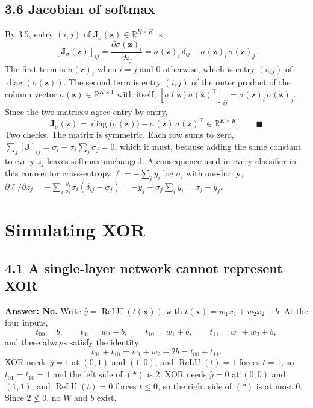 \documentclass[11pt]{article}
\newcommand{\R}{\mathbb{R}}
\DeclareMathOperator{\diag}{diag}
\DeclareMathOperator{\ReLU}{ReLU}
\begin{document}
\subsection*{3.6 Jacobian of softmax}
By 3.5, entry $(i,j)$ of $\mathbf{J}_\sigma(\mathbf{z})\in\R^{K\times K}$ is
\[
[\mathbf{J}_\sigma(\mathbf{z})]_{ij} = \frac{\partial\sigma(\mathbf{z})_i}{\partial z_j} = \sigma(\mathbf{z})_i\,\delta_{ij} - \sigma(\mathbf{z})_i\,\sigma(\mathbf{z})_j .
\]
The first term is $\sigma(\mathbf{z})_i$ when $i=j$ and $0$ otherwise, which is entry $(i,j)$ of $\diag(\sigma(\mathbf{z}))$. The second term is entry $(i,j)$ of the outer product of the column vector $\sigma(\mathbf{z})\in\R^{K\times1}$ with itself, $[\sigma(\mathbf{z})\sigma(\mathbf{z})^\top]_{ij} = \sigma(\mathbf{z})_i\,\sigma(\mathbf{z})_j$. Since the two matrices agree entry by entry,
\[
\mathbf{J}_\sigma(\mathbf{z}) = \diag\big(\sigma(\mathbf{z})\big) - \sigma(\mathbf{z})\,\sigma(\mathbf{z})^\top\in\R^{K\times K}. \qquad\blacksquare
\]
Two checks. The matrix is symmetric. Each row sums to zero, $\sum_j[\mathbf{J}]_{ij} = \sigma_i - \sigma_i\sum_j\sigma_j = 0$, which it must, because adding the same constant to every $z_j$ leaves softmax unchanged. A consequence used in every classifier in this course: for cross-entropy $\ell = -\sum_i y_i\log\sigma_i$ with one-hot $\mathbf{y}$, $\partial\ell/\partial z_j = -\sum_i \frac{y_i}{\sigma_i}\sigma_i(\delta_{ij}-\sigma_j) = -y_j + \sigma_j\sum_i y_i = \sigma_j - y_j$.

\section{Simulating XOR}

\subsection*{4.1 A single-layer network cannot represent XOR}
\textbf{Answer: No.} Write $\hat y = \ReLU(t(\mathbf{x}))$ with $t(\mathbf{x}) = w_1x_1 + w_2x_2 + b$. At the four inputs,
\[
t_{00} = b,\qquad t_{01} = w_2+b,\qquad t_{10} = w_1+b,\qquad t_{11} = w_1+w_2+b,
\]
and these always satisfy the identity
\[
t_{01} + t_{10} = w_1+w_2+2b = t_{00} + t_{11}. \tag{$\ast$}
\]
XOR needs $\hat y = 1$ at $(0,1)$ and $(1,0)$, and $\ReLU(t)=1$ forces $t=1$, so $t_{01} = t_{10} = 1$ and the left side of $(\ast)$ is $2$. XOR needs $\hat y = 0$ at $(0,0)$ and $(1,1)$, and $\ReLU(t)=0$ forces $t\le 0$, so the right side of $(\ast)$ is at most $0$. Since $2 \not\le 0$, no $W$ and $b$ exist.
\end{document}
